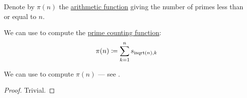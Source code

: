 \begin{definition}\label{def:prime_counting_function}
  Denote by \( \pi(n) \) the \hyperref[def:arithmetic_function]{arithmetic function} giving the number of primes less than or equal to \( n \).
\end{definition}

\begin{proposition}\label{thm:prime_counting_sieve}
  We can use  to compute the \hyperref[def:prime_counting_function]{prime counting function}:
  \begin{equation*}
    \pi(n) \coloneqq \sum_{k=1}^n s_{\op{isqrt}(n),k}
  \end{equation*}
\end{proposition}
\begin{comments}
  \item We can use  to compute \( \pi(n) \) --- see .
\end{comments}
\begin{proof}
  Trivial.
\end{proof}

